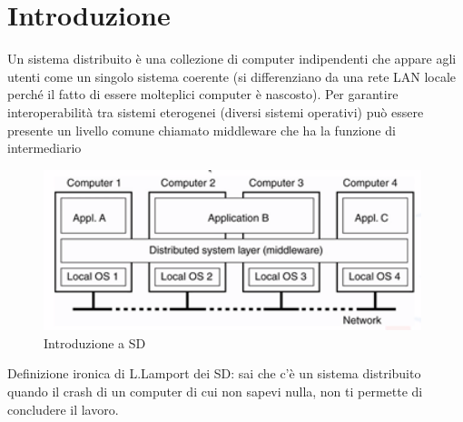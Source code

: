 \documentclass[12pt,italian]{report}
\begin{document}
\frontespizio 

\beforepreface
\afterpreface

\chapter{Introduzione}
\label{cap:introduzione}
Un sistema distribuito è una collezione di computer indipendenti che appare agli utenti come un singolo sistema coerente (si differenziano da una rete LAN locale perché il fatto di essere molteplici computer è nascosto). Per garantire interoperabilità tra sistemi eterogenei (diversi sistemi operativi) può essere presente un livello comune chiamato middleware che ha la funzione di intermediario 
\begin{figure}[h]
	\centering
    \includegraphics[width=110mm]{img/middle.png}
    \caption{Introduzione a SD}
    \label{fig:intro}
\end{figure}
\bigbreak
Definizione ironica di L.Lamport dei SD: sai che c'è un sistema distribuito quando il crash di un computer di cui non sapevi nulla, non ti permette di concludere il lavoro. 
\end{document}
